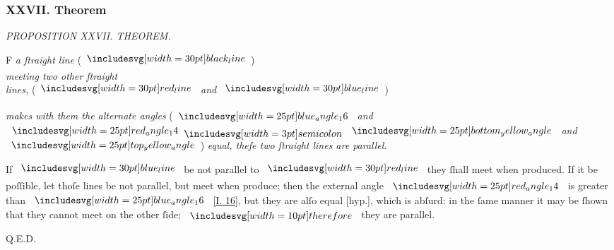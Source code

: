 \documentclass[11pt,preview]{standalone}
\begin{document}
\subsubsection{XXVII. Theorem}

\hfill

\begin{minipage}[t]{0.43\textwidth}
    \vspace{20pt}
    
\end{minipage}%
\hfill
\begin{minipage}[t]{0.55\textwidth}
    \begin{center}
        \textit{PROPOSITION XXVII. THEOREM.}\label{book1pr27} \\
    \end{center}

    \hfill

    \begin{center}
        \raggedright \lettrine[lines=3, loversize=1, nindent=0pt]{}{}F \textit{a ſtraight line} (\hspace{-1ex}$\blackline$\hspace{-1ex})\\ \textit{meeting two other ſtraight\\ lines,} (\hspace{-1ex}$\redline$ \textit{and} $\blueline$\hspace{-1ex})
    \end{center}
    \textit{makes with them the alternate angles} (\hspace{-1ex}$\img{blue_angle_16}$ \textit{and} $\img{red_angle_14} \bsemicolon \img{bottom_yellow_angle}$ \textit{and} $\img{top_yellow_angle}$\hspace{-1ex}) \textit{equal, theſe two ſtraight lines are parallel}.
\end{minipage}

\hfill

\hfill

\raggedright If $\blueline$ be not parallel to $\redline$ they ſhall meet when produced. If it be poſſible, let thoſe lines be not parallel, but meet when produce; then the external angle $\img{red_angle_14}$ is greater than $\img{blue_angle_16}$ [\hyperref[book1pr16]{\textsc{I.} 16}], but they are alſo equal [hyp.], which is abſurd: in the ſame manner it may be ſhown that they cannot meet on the other ſide; $\btherefore$ they are parallel.

\hfill

\hfill Q.E.D.
\end{document}
